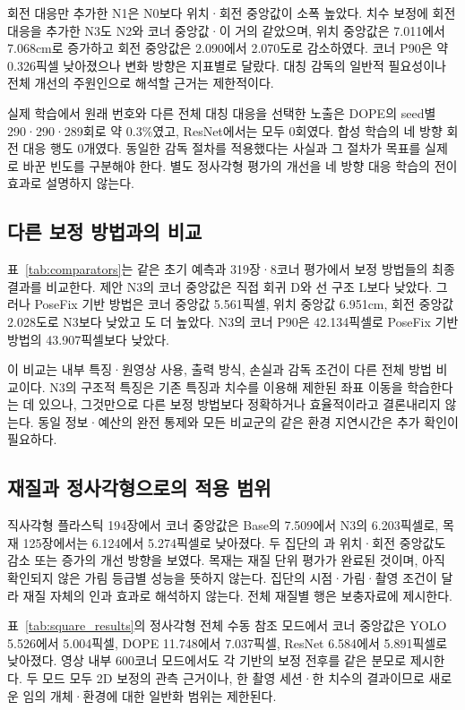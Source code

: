 회전 대응만 추가한 N1은 N0보다 위치·회전 중앙값이 소폭 높았다. 치수 보정에 회전 대응을 추가한 N3도 N2와 코너 중앙값·\pckten 이 거의 같았으며, 위치 중앙값은 7.011에서 7.068cm로 증가하고 회전 중앙값은 2.090에서 2.070도로 감소하였다. 코너 P90은 약 0.326픽셀 낮아졌으나 변화 방향은 지표별로 달랐다. 대칭 감독의 일반적 필요성이나 전체 개선의 주원인으로 해석할 근거는 제한적이다.

실제 학습에서 원래 번호와 다른 전체 대칭 대응을 선택한 노출은 DOPE의 seed별 290·290·289회로 약 0.3\%였고, ResNet에서는 모두 0회였다. 합성 학습의 네 방향 회전 대응 행도 0개였다. 동일한 감독 절차를 적용했다는 사실과 그 절차가 목표를 실제로 바꾼 빈도를 구분해야 한다. 별도 정사각형 평가의 개선을 네 방향 대응 학습의 전이 효과로 설명하지 않는다.

\subsection{다른 보정 방법과의 비교}
표~\ref{tab:comparators}는 같은 초기 예측과 319장·8코너 평가에서 보정 방법들의 최종 결과를 비교한다. 제안 N3의 코너 중앙값은 직접 회귀 D와 선 구조 L보다 낮았다. 그러나 PoseFix 기반 방법은 코너 중앙값 5.561픽셀, 위치 중앙값 6.951cm, 회전 중앙값 2.028도로 N3보다 낮았고 \pckten 도 더 높았다. N3의 코너 P90은 42.134픽셀로 PoseFix 기반 방법의 43.907픽셀보다 낮았다.


이 비교는 내부 특징·원영상 사용, 출력 방식, 손실과 감독 조건이 다른 전체 방법 비교이다. N3의 구조적 특징은 기존 특징과 치수를 이용해 제한된 좌표 이동을 학습한다는 데 있으나, 그것만으로 다른 보정 방법보다 정확하거나 효율적이라고 결론내리지 않는다. 동일 정보·예산의 완전 통제와 모든 비교군의 같은 환경 지연시간은 추가 확인이 필요하다.

\subsection{재질과 정사각형으로의 적용 범위}
직사각형 플라스틱 194장에서 코너 중앙값은 Base의 7.509에서 N3의 6.203픽셀로, 목재 125장에서는 6.124에서 5.274픽셀로 낮아졌다. 두 집단의 \pckten 과 위치·회전 중앙값도 감소 또는 증가의 개선 방향을 보였다. 목재는 재질 단위 평가가 완료된 것이며, 아직 확인되지 않은 가림 등급별 성능을 뜻하지 않는다. 집단의 시점·가림·촬영 조건이 달라 재질 자체의 인과 효과로 해석하지 않는다. 전체 재질별 행은 보충자료에 제시한다.

표~\ref{tab:square_results}의 정사각형 전체 수동 참조 모드에서 코너 중앙값은 YOLO 5.526에서 5.004픽셀, DOPE 11.748에서 7.037픽셀, ResNet 6.584에서 5.891픽셀로 낮아졌다. 영상 내부 600코너 모드에서도 각 기반의 보정 전후를 같은 분모로 제시한다. 두 모드 모두 2D 보정의 관측 근거이나, 한 촬영 세션·한 치수의 결과이므로 새로운 임의 개체·환경에 대한 일반화 범위는 제한된다.


